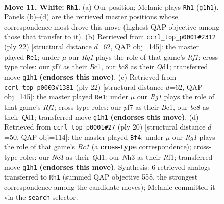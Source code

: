 \documentclass[11pt]{article}
\begin{document}
\clearpage

\begin{figure}[p]\centering
\begin{subfigure}{0.46\textwidth}\centering
\resizebox{\linewidth}{!}{%
\newchessgame
\chessboard[
  setfen={r1b1qrk1/1ppn1ppp/p1n1p3/3pP3/3P1P2/2N4N/PPP2KPP/R2Q1BR1 w - - 6 11},
  showmover=false,
  pgfstyle=straightmove, color=movearrow, markmove={g1-h1}
]}
\caption{}
\end{subfigure}\hfill
\begin{subfigure}{0.46\textwidth}\centering
\resizebox{\linewidth}{!}{%
\newchessgame
\chessboard[
  setfen={r1bq1rk1/p1n2pbp/3p1np1/1ppP4/4P3/2NB1N1P/PP3PP1/R1BQ1RK1 w - - 0 12},
  showmover=false,
  pgfstyle=straightmove, color=movearrow, markmove={f1-e1}
]}
\caption{}
\end{subfigure}
\\[4pt]
\begin{subfigure}{0.46\textwidth}\centering
\resizebox{\linewidth}{!}{%
\newchessgame
\chessboard[
  setfen={r1bq1rk1/p1n2pbp/3p1np1/1ppP4/4P3/2NB1N1P/PP3PP1/R1BQ1RK1 w - - 0 12},
  showmover=false,
  pgfstyle=straightmove, color=movearrow, markmove={f1-e1}
]}
\caption{}
\end{subfigure}\hfill
\begin{subfigure}{0.46\textwidth}\centering
\resizebox{\linewidth}{!}{%
\newchessgame
\chessboard[
  setfen={rnbq1rk1/5pbp/p2p1np1/1ppP4/4P3/2NB1N1P/PP3PP1/R1BQ1RK1 w - - 4 11},
  showmover=false,
  pgfstyle=straightmove, color=movearrow, markmove={c1-f4}
]}
\caption{}
\end{subfigure}
\caption{\textbf{Move 11, White: \texttt{Rh1}.} (a) Our position; Melanie plays \texttt{Rh1} (\texttt{g1h1}). Panels (b)--(d) are the retrieved master positions whose correspondence most drove this move (highest QAP objective among those that transfer to it). (b) Retrieved from \texttt{ccrl\_top\_p0001\#2312} (ply 22) [structural distance $d$=62, QAP obj=145]: the master played \texttt{Re1}; under $\mu$ our \emph{Rg1} plays the role of that game's \emph{Rf1}; cross-type roles: our \emph{p}f7 as their \emph{B}c1, our \emph{b}c8 as their \emph{Q}d1; transferred move \texttt{g1h1} \textbf{(endorses this move)}. (c) Retrieved from \texttt{ccrl\_top\_p0003\#1381} (ply 22) [structural distance $d$=62, QAP obj=145]: the master played \texttt{Re1}; under $\mu$ our \emph{Rg1} plays the role of that game's \emph{Rf1}; cross-type roles: our \emph{p}f7 as their \emph{B}c1, our \emph{b}c8 as their \emph{Q}d1; transferred move \texttt{g1h1} \textbf{(endorses this move)}. (d) Retrieved from \texttt{ccrl\_top\_p0001\#27} (ply 20) [structural distance $d$=50, QAP obj=114]: the master played \texttt{Bf4}; under $\mu$ our \emph{Rg1} plays the role of that game's \emph{Bc1} (a \textbf{cross-type} correspondence); cross-type roles: our \emph{N}c3 as their \emph{Q}d1, our \emph{N}h3 as their \emph{R}f1; transferred move \texttt{g1h1} \textbf{(endorses this move)}. Synthesis: 6 retrieved analogs transferred to \texttt{Rh1} (summed QAP objective 558, the strongest correspondence among the candidate moves); Melanie committed it via the \texttt{search} selector.}
\label{fig:thought-m20}
\end{figure}
\end{document}
